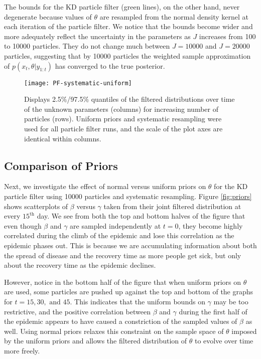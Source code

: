 \documentclass{elsarticle}
\begin{document}
The bounds for the KD particle filter (green lines), on the other hand, never degenerate because values of $\theta$ are resampled from the normal density kernel at each iteration of the particle filter.  We notice that the bounds become wider and more adequately reflect the uncertainty in the parameters as $J$ increases from 100 to 10000 particles.  They do not change much between $J = 10000$ and $J = 20000$ particles, suggesting that by 10000 particles the weighted sample approximation of $p(x_t,\theta|y_{1:t})$ has converged to the true posterior.

\begin{figure}
\centering
\texttt{[image: PF-systematic-uniform]}
\caption{Displays 2.5\%/97.5\% quantiles of the filtered distributions over time of the unknown parameters (columns) for increasing number of particles (rows).  Uniform priors and systematic resampling were used for all particle filter runs, and the scale of the plot axes are identical within columns.} \label{fig:unisys}
\end{figure}

\subsection{Comparison of Priors}

Next, we investigate the effect of normal versus uniform priors on $\theta$ for the KD particle filter using 10000 particles and systematic resampling.  Figure \ref{fig:priors} shows scatterplots of $\beta$ versus $\gamma$ taken from their joint filtered distribution at every $15^{\mbox{th}}$ day.  We see from both the top and bottom halves of the figure that even though $\beta$ and $\gamma$ are sampled independently at $t = 0$, they become highly correlated during the climb of the epidemic and lose this correlation as the epidemic phases out.  This is because we are accumulating information about both the spread of disease and the recovery time as more people get sick, but only about the recovery time as the epidemic declines.

However, notice in the bottom half of the figure that when uniform priors on $\theta$ are used, some particles are pushed up against the top and bottom of the graphs for $t = 15, 30, \mbox{ and } 45$.  This indicates that the uniform bounds on $\gamma$ may be too restrictive, and the positive correlation between $\beta$ and $\gamma$ during the first half of the epidemic appears to have caused a constriction of the sampled values of $\beta$ as well.  Using normal priors relaxes this constraint on the sample space of $\theta$ imposed by the uniform priors and allows the filtered distribution of $\theta$ to evolve over time more freely.
\end{document}
